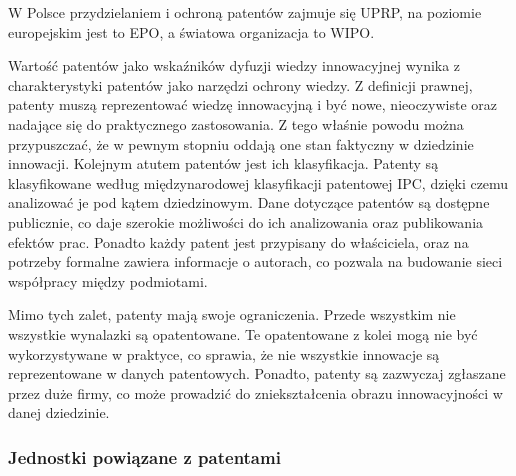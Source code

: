 W Polsce przydzielaniem i ochroną patentów zajmuje się \ac{UPRP}, 
na poziomie europejskim jest to \ac{EPO}, a światowa organizacja 
to \ac{WIPO}.

Wartość patentów jako wskaźników dyfuzji wiedzy innowacyjnej
wynika z charakterystyki patentów jako narzędzi ochrony wiedzy.
Z definicji prawnej, patenty muszą reprezentować wiedzę innowacyjną
i być nowe, nieoczywiste oraz nadające się do praktycznego
zastosowania. Z tego właśnie powodu można przypuszczać, że
w pewnym stopniu oddają one stan faktyczny w dziedzinie innowacji.
Kolejnym atutem patentów jest ich klasyfikacja.
Patenty są klasyfikowane według międzynarodowej klasyfikacji
patentowej \ac{IPC}, dzięki czemu analizować je pod kątem dziedzinowym.
Dane dotyczące patentów są dostępne publicznie, co daje 
szerokie możliwości do ich analizowania oraz publikowania efektów
prac. Ponadto każdy patent jest przypisany do właściciela, oraz
na potrzeby formalne zawiera informacje o autorach, co pozwala
na budowanie sieci współpracy między podmiotami.

Mimo tych zalet, patenty mają swoje ograniczenia. Przede wszystkim
nie wszystkie wynalazki są opatentowane. Te opatentowane z kolei
mogą nie być wykorzystywane w praktyce, co sprawia, że nie
wszystkie innowacje są reprezentowane w danych patentowych.
Ponadto, patenty są zazwyczaj zgłaszane przez duże firmy, co
może prowadzić do zniekształcenia obrazu innowacyjności w
danej dziedzinie.



\subsubsection{Jednostki powiązane z patentami}

